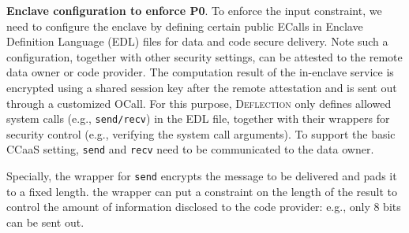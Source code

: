 \vspace{3pt}\noindent\textbf{Enclave configuration to enforce P0}. 
To enforce the input constraint, we need to configure the enclave by defining certain public ECalls in Enclave Definition Language (EDL) files for data and code secure delivery. Note such a configuration, together with other security settings, can be attested to the remote data owner or code provider. The computation result of the in-enclave service is encrypted using a shared session key after the remote attestation and is sent out through a customized OCall. For this purpose, \textsc{Deflection} only defines allowed system calls (e.g., \texttt{send/recv}) in the EDL file, together with their wrappers for security control (e.g., verifying the system call arguments).
To support the basic CCaaS setting,  \texttt{send} and \texttt{recv} need to be communicated to the data owner. 
\DIFaddbegin 

\DIFaddend Specially, the wrapper for \texttt{send} encrypts the message to be delivered and pads it to a fixed length. \DIFdelbegin {}\DIFdelend \DIFaddbegin {}\DIFaddend the wrapper can put a constraint on the length of the result to control the amount of information disclosed to the code provider: e.g., only 8 bits can be sent out.


